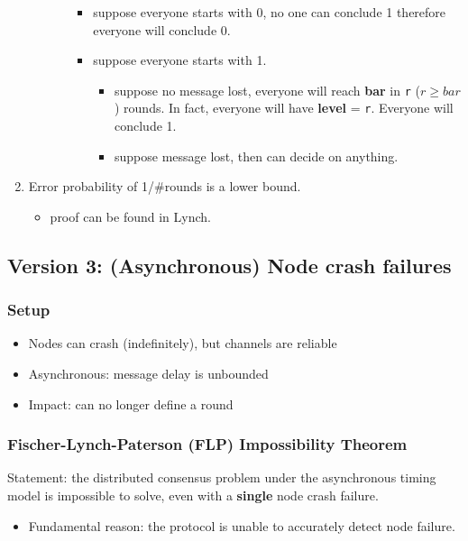 \documentclass[11pt]{article}
\begin{document}
\begin{enumerate}
\begin{enumerate}
\begin{enumerate}
                        \label{sec:orgecacf0a}
                        \begin{itemize}
                          \item suppose everyone starts with 0, no one can conclude 1 therefore everyone will
                                conclude 0.
                          \item suppose everyone starts with 1.
                                \begin{itemize}
                                  \item suppose no message lost, everyone will reach \textbf{bar} in \texttt{r} (\(r\ge bar\))
                                        rounds. In fact, everyone will have \textbf{level} = \texttt{r}. Everyone will conclude 1.
                                  \item suppose message lost, then can decide on anything.
                                \end{itemize}
                        \end{itemize}
                \end{enumerate}
        \end{enumerate}
  \item Error probability of 1/\#rounds is a lower bound.
        \label{sec:orge6193b0}
        \begin{itemize}
          \item proof can be found in Lynch.
        \end{itemize}
\end{enumerate}
\subsection{Version 3: (Asynchronous) Node crash failures}
\label{sec:orgdf19b89}
\subsubsection{Setup}
\label{sec:org78afd07}
\begin{itemize}
  \item Nodes can crash (indefinitely), but channels are reliable
  \item Asynchronous: message delay is unbounded
  \item Impact: can no longer define a round
\end{itemize}
\subsubsection{Fischer-Lynch-Paterson (FLP) Impossibility Theorem}
\label{sec:org3e9aec6}
Statement: the distributed consensus problem under the asynchronous timing model
is impossible to solve, even with a \textbf{single} node crash failure.
\begin{itemize}
  \item Fundamental reason: the protocol is unable to accurately detect node failure.
\end{itemize}
\end{document}
